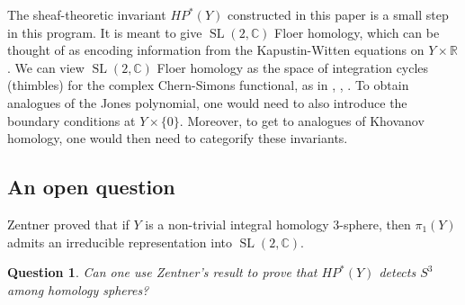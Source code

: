 \documentclass [11pt]{amsart}
\newtheorem {question}[theorem]{Question}
\theoremstyle{remark}
\def\rr {{\mathbb{R}}}
\def\cc {{\mathbb{C}}}
\def\R{\rr}
\def\HP{\mathit{HP}}
\def\sl {{\operatorname{SL}(2, \cc)}}
\begin{document}
The sheaf-theoretic invariant $\HP^*(Y)$ constructed in this paper is a small step in this program. It is meant to give $\sl$ Floer homology, which can be thought of as encoding information from the Kapustin-Witten equations on $Y \times \R$. We can view $\sl$ Floer homology as the space of integration cycles (thimbles) for the complex Chern-Simons functional, as in \cite{WittenAC}, \cite{FiveBranes}, \cite{WittenLectures1}. To obtain analogues of the Jones polynomial, one would need to also introduce the boundary conditions at $Y \times \{0\}$. Moreover, to get to analogues of Khovanov homology, one would then need to categorify these  invariants. 


\subsection{An open question} Zentner \cite{Zentner} proved that if $Y$ is a non-trivial integral homology $3$-sphere, then $\pi_1(Y)$ admits an irreducible representation into $\sl$.

\begin{question}
Can one use Zentner's result to prove that $\HP^*(Y)$ detects $S^3$ among homology spheres? 
\end{question}



\end{document}
